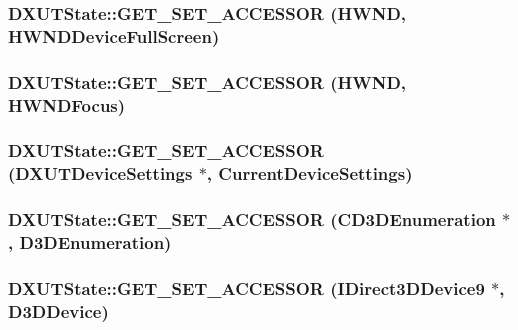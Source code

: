 \label{class_d_x_u_t_state_a5011c6600f15959fd9d4b7be0e44d520}
\hypertarget{class_d_x_u_t_state_a8132d1d49aa7bf1fbf06c3f85d0f0658}{
\subsubsection[{GET\_\-SET\_\-ACCESSOR}]{\setlength{\rightskip}{0pt plus 5cm}DXUTState::GET\_\-SET\_\-ACCESSOR (HWND, \/  HWNDDeviceFullScreen)}}
\label{class_d_x_u_t_state_a8132d1d49aa7bf1fbf06c3f85d0f0658}
\hypertarget{class_d_x_u_t_state_a9cfa587aab5d6f88711e558ae4d5f6b1}{
\subsubsection[{GET\_\-SET\_\-ACCESSOR}]{\setlength{\rightskip}{0pt plus 5cm}DXUTState::GET\_\-SET\_\-ACCESSOR (HWND, \/  HWNDFocus)}}
\label{class_d_x_u_t_state_a9cfa587aab5d6f88711e558ae4d5f6b1}
\hypertarget{class_d_x_u_t_state_ae718d3f29ce272c69ca2f1c4a5785c1d}{
\subsubsection[{GET\_\-SET\_\-ACCESSOR}]{\setlength{\rightskip}{0pt plus 5cm}DXUTState::GET\_\-SET\_\-ACCESSOR ({\bf DXUTDeviceSettings} $\ast$, \/  CurrentDeviceSettings)}}
\label{class_d_x_u_t_state_ae718d3f29ce272c69ca2f1c4a5785c1d}
\hypertarget{class_d_x_u_t_state_a97b73cb599c484baa4476b379544eaee}{
\subsubsection[{GET\_\-SET\_\-ACCESSOR}]{\setlength{\rightskip}{0pt plus 5cm}DXUTState::GET\_\-SET\_\-ACCESSOR ({\bf CD3DEnumeration} $\ast$, \/  D3DEnumeration)}}
\label{class_d_x_u_t_state_a97b73cb599c484baa4476b379544eaee}
\hypertarget{class_d_x_u_t_state_ab61abb00dd9ec46ed0ac175a3c8da16e}{
\subsubsection[{GET\_\-SET\_\-ACCESSOR}]{\setlength{\rightskip}{0pt plus 5cm}DXUTState::GET\_\-SET\_\-ACCESSOR (IDirect3DDevice9 $\ast$, \/  D3DDevice)}}
